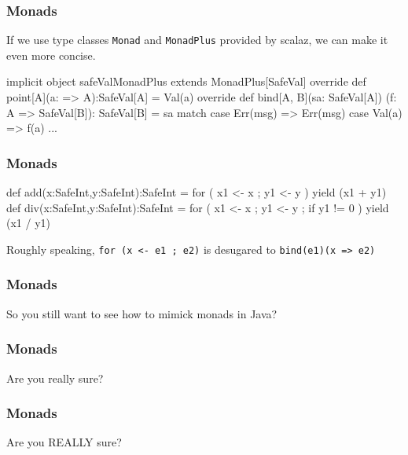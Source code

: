 \documentclass{beamer}
\newcommand{\beb}{\begin{exampleblock}}
\newcommand{\eeb}{\end{exampleblock}}
\begin{document}
\begin{frame}[fragile]
\frametitle{Monads}
If we use type classes {\tt Monad} and {\tt MonadPlus} provided by
scalaz, we can make it even more concise. 
\beb{}
\begin{code}
implicit object safeValMonadPlus 
  extends MonadPlus[SafeVal] {
  override def point[A](a: => A):SafeVal[A] = Val(a)
  override def bind[A, B](sa: SafeVal[A])
  (f: A => SafeVal[B]): SafeVal[B] = sa match {
    case Err(msg) => Err(msg)
    case Val(a)   => f(a)
  } 
 ... 
}
\end{code}
\eeb{}
\end{frame}

\begin{frame}[fragile]
\frametitle{Monads}
\beb{}
\begin{code}
def add(x:SafeInt,y:SafeInt):SafeInt = {
  for ( x1 <- x
  ; y1 <- y
  ) yield (x1 + y1)
}
def div(x:SafeInt,y:SafeInt):SafeInt = {
  for ( x1 <- x
  ; y1 <- y
  ; if y1 != 0
  ) yield (x1 / y1)
}
\end{code}
\eeb{}
Roughly speaking, {\tt for (x <- e1 ; e2)} is desugared to 
{\tt bind(e1)(x => e2)}
\end{frame}
\begin{frame}[fragile]
\frametitle{Monads}
So you still want to see how to mimick monads in Java?

\end{frame}


\begin{frame}[fragile]
\frametitle{Monads}

Are you really sure?

\end{frame}

\begin{frame}[fragile]
\frametitle{Monads}

\huge{Are you REALLY sure?}

\end{frame}
\end{document}
